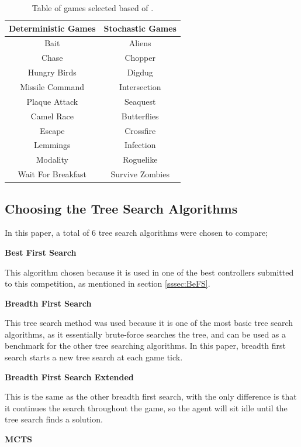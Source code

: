\documentclass[journal]{IEEEtran}
\begin{document}
	
	\begin{table}[h!]
	\centering
	\begin{tabular} { |c||c|} 
		 \hline
		 \bf{Deterministic Games} & \bf{Stochastic Games} \\
		 \hline
		 Bait & Aliens  \\
 		Chase  & Chopper   \\
		Hungry Birds  & Digdug   \\
		Missile Command  & Intersection   \\
		Plaque Attack  & Seaquest   \\
		Camel Race  & Butterflies   \\
		Escape  & Crossfire   \\
		Lemmings  & Infection   \\
		Modality  & Roguelike   \\
		Wait For Breakfast  & Survive Zombies   \\
		\hline
	\end{tabular}
	\caption{ Table of games selected based of \cite{guerrero2017beyond, gaina2017population}.}
	\label{GamesTable}
	\end{table}

	\subsection{Choosing the Tree Search Algorithms}
	In this paper, a total of 6 tree search algorithms were chosen to compare;
	
	\textbf{Best First Search}

	This algorithm chosen because it is used in one of the best controllers submitted to this competition, as mentioned in section \ref{sssec:BeFS}.

	\textbf{Breadth First Search}

This tree search method was used because it is one of the most basic tree search algorithms, as it essentially brute-force searches the tree, and can be used as a benchmark for the other tree searching algorithms. In this paper, breadth first search starts a new tree search at each game tick.

	\textbf{Breadth First Search Extended}

	This is the same as the other breadth first search, with the only difference is that it continues the search throughout the game, so the agent will sit idle until the tree search finds a solution.

	\textbf{MCTS}
\end{document}
